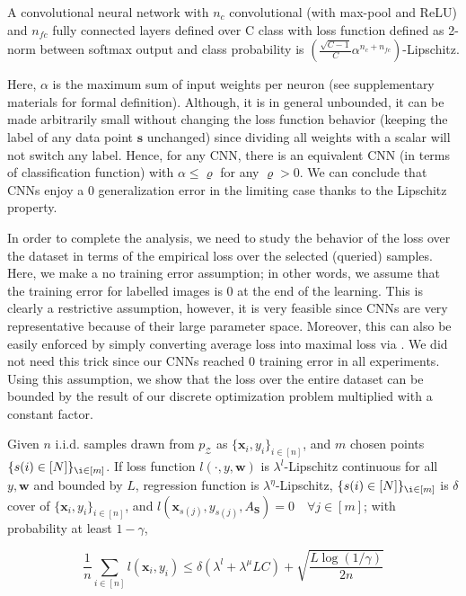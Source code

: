\begin{lemma}
A convolutional neural network with $n_c$ convolutional (with max-pool and ReLU) and $n_{fc}$ fully connected layers defined over C class with loss function defined as 2-norm between softmax output and class probability is $\left(\frac{\sqrt{C-1}}{C} \alpha^{n_c+n_{fc}}\right)$-Lipschitz.
\end{lemma}

Here, $\alpha$ is the maximum sum of  input weights per neuron (see supplementary materials for formal definition). Although, it is in general unbounded, it can be made arbitrarily small without changing the loss function behavior (\ie keeping the label of any data point $\mathbf{s}$ unchanged) since dividing all weights with a scalar will not switch any label. Hence, for any CNN, there is an equivalent CNN (in terms of classification function) with $\alpha \leq \varrho$ for any $\varrho > 0$. We can conclude that CNNs enjoy a $0$ generalization error in the limiting case thanks to the Lipschitz property.

In order to complete the analysis, we need to study the behavior of the loss over the dataset in terms of the empirical loss over the selected (queried) samples. Here, we make a no training error assumption; in other words, we assume that the training error for labelled images is $0$ at the end of the learning. This is clearly a restrictive assumption, however, it is very feasible since CNNs are very representative because of their large parameter space. Moreover, this can also be easily enforced by simply converting average loss into maximal loss via \cite{maximal_loss}. We did not need this trick since our CNNs reached 0 training error in all experiments. Using this assumption, we show that the loss over the entire dataset can be bounded by the result of our discrete optimization problem multiplied with a constant factor.

\begin{theorem}
Given $n$ i.i.d. samples drawn from $p_\mathcal{Z}$ as $\{\mathbf{x}_i,y_i\}_{i\in[n]}$, and $m$ chosen points $\{ s(i) \in [N]\}_{\i \in [m]}$. If loss function $l(\cdot,y,\mathbf{w})$ is $\lambda^l$-Lipschitz continuous for all $y, \mathbf{w}$ and bounded by $L$, regression function is $\lambda^\eta$-Lipschitz, $\{ s(i) \in [N]\}_{\i \in [m]}$ is $\delta$ cover of $\{\mathbf{x}_i,y_i\}_{i\in[n]}$, and $l(\mathbf{x}_{s(j)},y_{s(j)},A_\mathbf{S})=0\quad \forall j \in [m]$; with probability at least $1-\gamma$,
\begin{small}
\[
\frac{1}{n}\sum_{i \in [n]} l(\mathbf{x}_i,y_i) \leq \delta (\lambda^l + \lambda^\mu LC)+ 
\sqrt{\frac{L \log(1/\gamma)}{2n}}
\]
\end{small}
\label{mainthm2}
\end{theorem}

